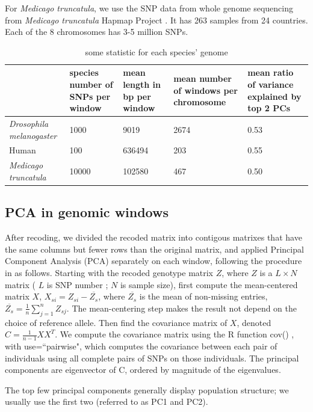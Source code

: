 \documentclass[11pt, oneside]{article}   	%
\begin{document}
For \textit{Medicago truncatula}, we use the SNP data from whole genome sequencing from \textit{Medicago truncatula} Hapmap Project \citep{tang2014improved}. 
It has 263 samples from 24 countries. 
Each of the 8 chromosomes has 3-5 million SNPs.

\begin{table}[ht]
\centering
\begin{tabular}{p{0.8in}p{1in}p{1in}p{1in}p{1.2in}}
  \hline
 & species number of SNPs per window & mean length in bp per window & mean number of windows per chromosome & mean ratio of variance explained by top 2 PCs \\ 
  \hline
\textit{Drosophila melanogaster} & 1000 & 9019 & 2674 & 0.53 \\ 
  Human & 100 & 636494 & 203 & 0.55 \\ 
  \textit{Medicago truncatula} & 10000 & 102580 & 467 & 0.50 \\ 
   \hline
\end{tabular}
\caption {some statistic for each species' genome}
\end{table}


\subsection{PCA in genomic windows}

After recoding, we divided the recoded matrix into contigous matrixes that have the same columns but fewer rows than the original matrix, 
and applied Principal Component Analysis (PCA) separately on each window, 
following the procedure in \citet{mcvean2009genealogical} as follows. Starting with the recoded genotype matrix $Z$, 
where $Z$ is a $L\times N$ matrix ( $L$ is SNP number ; $N$ is sample size), 
first compute the mean-centered matrix $X$, $X_{si}=Z_{si}-\overline{Z_{s}}$, 
where $\overline{Z_{s}}$ is the mean of non-missing entries, $\overline{Z_{s}}=\frac{1}{n}\sum_{j=1}^{n}Z_{sj}$.
The mean-centering step makes the result not depend on the choice of reference allele.
Then find the covariance matrix of $X$, denoted $C=\frac{1}{n-1}XX^{T}$. 
We compute the covariance matrix using the R function cov() , with use=``pairwise",
which computes the covariance between each pair of individuals using all complete pairs of SNPs on those individuals.
The principal components are eigenvector of C, ordered by magnitude of the eigenvalues.

The top few principal components generally display population structure; we usually use the first two (referred to as PC1 and PC2).
\end{document}
